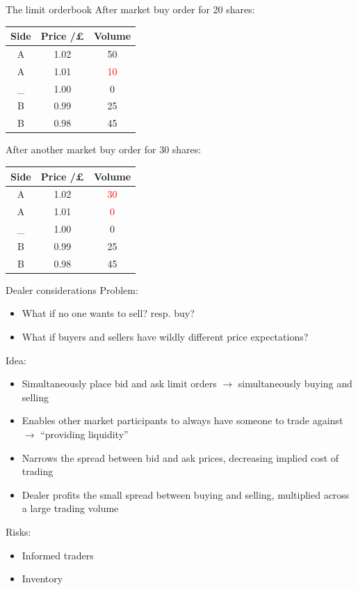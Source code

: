 \documentclass{beamer} %
\begin{document}
\begin{frame}{The limit orderbook}
    After market buy order for 20 shares:
    \begin{center}
        \begin{tabular}{ |c|c|c| } 
            \hline
            Side & Price /£ & Volume \\ 
            \hline
            A & 1.02 & 50 \\
            A & 1.01 & \textcolor{red}{10} \\
            \_ & 1.00 & 0 \\
            B & 0.99 & 25 \\ 
            B & 0.98 & 45 \\
            \hline
        \end{tabular}
    \end{center}
    After another market buy order for 30 shares:
    \begin{center}
        \begin{tabular}{ |c|c|c| } 
            \hline
            Side & Price /£ & Volume \\ 
            \hline
            A & 1.02 & \textcolor{red}{30} \\
            A & 1.01 & \textcolor{red}{0} \\
            \_ & 1.00 & 0 \\
            B & 0.99 & 25 \\ 
            B & 0.98 & 45 \\
            \hline
        \end{tabular}
    \end{center}
\end{frame}

\begin{frame}{Dealer considerations}
    Problem:
    \begin{itemize}
        \item What if no one wants to sell? resp. buy?
        \item What if buyers and sellers have wildly different price expectations?
    \end{itemize}
    Idea:
    \begin{itemize}
        \item Simultaneously place bid and ask limit orders $\rightarrow$ simultaneously buying and selling
        \item Enables other market participants to always have someone to trade against $\rightarrow$ ``providing liquidity''
        \item Narrows the spread between bid and ask prices, decreasing implied cost of trading
        \item Dealer profits the small spread between buying and selling, multiplied across a large trading volume
    \end{itemize}
    Risks:
    \begin{itemize}
        \item Informed traders
        \item Inventory
    \end{itemize}
\end{frame}
\end{document}
